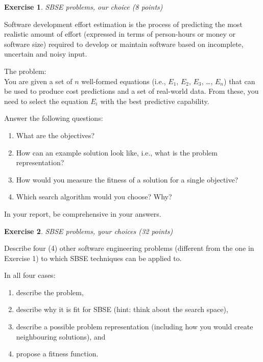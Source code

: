 \documentclass{pracs}
\newcommand{\ignore}[1]{}
\newtheorem{exercise}{Exercise}
\begin{document}
\ignore{\begin{exercise}
Team work: who has done what? (zero points)
\end{exercise}
We'd like each team member to write one paragraph about what he or she has contributed to this assignment. We will not mark this, and it will not have any effect on the marking of the other exercises. You might now ask "why do this then?" --- well, through this no-stakes approach, we'd like to encourage self-regulation within the group and cooperative learning. You can't lose, you can only win.
}


\begin{exercise}
SBSE problems, our choice (8 points)
\end{exercise}

Software development effort estimation is the process of predicting the most realistic amount of effort (expressed in terms of person-hours or money or software size) required to develop or maintain software based on incomplete, uncertain and noisy input. 

The problem:\\
You are given a set of $n$ well-formed equations (i.e., $E_1$, $E_2$, $E_3$, \ldots, $E_n$) that can be used to produce cost predictions and a set of real-world data. From these, you need to select the equation $E_i$ with the best predictive capability.

Answer the following questions:
\begin{enumerate}
\item What are the objectives?
\item How can an example solution look like, i.e., what is the problem representation?
\item How would you measure the fitness of a solution for a single objective?
\item Which search algorithm would you choose? Why?
\end{enumerate}

In your report, be comprehensive in your answers. 

\begin{exercise}
SBSE problems, your choices (32 points)
\end{exercise}

Describe four (4) other software engineering problems (different from the one in Exercise 1) to which SBSE techniques can be applied to. 

In all four cases:
\begin{enumerate}
\item describe the problem, 
\item describe why it is fit for SBSE (hint: think about the search space), 
\item describe a possible problem representation (including how you would create neighbouring solutions), and 
\item propose a fitness function.
\end{enumerate}
\end{document}
